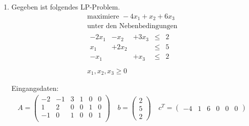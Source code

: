 \documentclass[a4paper]{scrartcl}
\begin{document}
\begin{enumerate}[label=\bfseries\arabic*.]
\begin{enumerate}
\begin{enumerate}[1.]
\begin{enumerate}[1.]
                        \end{enumerate}

                \end{enumerate}
                

            \item
                Gegeben ist folgendes LP-Problem.
                \begin{equation}
                    \begin{gathered}
                        \text{maximiere }
                        -4x_1 +x_2 +6x_3 \\
                        \text{unter den Nebenbedingungen} \\
                        \begin{array}{rrrcr}
                            -2x_1 & -x_2 & +3x_3 & \leq & 2 \\
                            x_1 & +2x_2 & & \leq & 5 \\
                            -x_1 & & +x_3 & \leq & 2 \\
                        \end{array} \\
                        x_1, x_2, x_3 \geq 0
                    \end{gathered}
                \end{equation}

                Eingangsdaten:
                \begin{gather}
                    A =
                    \begin{pmatrix}
                        -2 & -1 & 3 & 1 & 0 & 0 \\
                         1 &  2 & 0 & 0 & 1 & 0 \\
                        -1 &  0 & 1 & 0 & 0 & 1 \\
                    \end{pmatrix}
                    \quad
                    b =
                    \begin{pmatrix}
                        2 \\ 5 \\ 2
                    \end{pmatrix}
                    \quad
                    c^T =
                    \begin{pmatrix}
                        -4 & 1 & 6 & 0 & 0 & 0
                    \end{pmatrix}
                \end{gather}


\end{enumerate}
\end{enumerate}
\end{document}
